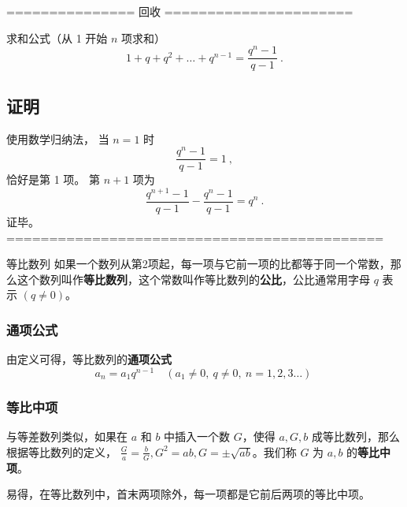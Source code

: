 


=============== 回收 ======================

求和公式（从 1 开始 $n$ 项求和）
\begin{equation}
1 + q + q^2 + \dots + q^{n-1} = \frac{q^n - 1}{q - 1}~.
\end{equation}

\subsection{证明}
使用数学归纳法， 当 $n = 1$ 时
\begin{equation}
\frac{q^n - 1}{q - 1} = 1~,
\end{equation}
恰好是第 1 项。 第 $n + 1$ 项为
\begin{equation}
\frac{q^{n+1} - 1}{q - 1} - \frac{q^n - 1}{q - 1} = q^n~.
\end{equation}
证毕。
============================================



\begin{definition}{等比数列}
如果一个数列从第2项起，每一项与它前一项的比都等于同一个常数，那么这个数列叫作\textbf{等比数列}，这个常数叫作等比数列的\textbf{公比}，公比通常用字母 $q$ 表示 $(q\ne 0)$。
\end{definition}

\subsubsection{通项公式}
由定义可得，等比数列的\textbf{通项公式}
\begin{equation}
a_n = a_1 q^{n-1} \quad (a_1 \ne 0,\ q\ne 0,\ n=1,2,3\dots)~
\end{equation}

\subsubsection{等比中项}
与等差数列类似，如果在 $a$ 和 $b$ 中插入一个数 $G$，使得 $a,G,b$ 成等比数列，那么根据等比数列的定义， $\frac{G}{a} = \frac{b}{G},G^2 = ab,G = \pm \sqrt{ab}$。我们称 $G$ 为 $a,b$ 的\textbf{等比中项}。

易得，在等比数列中，首末两项除外，每一项都是它前后两项的等比中项。

